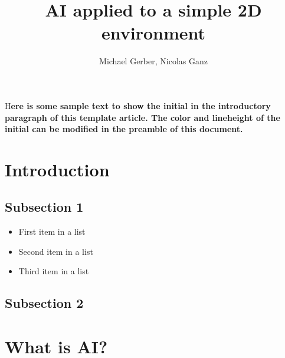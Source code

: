 \documentclass[DIV=calc, paper=a4, fontsize=11pt, twocolumn]{scrartcl}	 %
\title{AI applied to a simple 2D environment} %
\author{Michael Gerber, Nicolas Ganz } %
\date{} %
\newcommand{\initial}[1]{ %
\lettrine[lines=3,lhang=0.3,nindent=0em]{
\color{DarkGoldenrod}
{\textsf{#1}}}{}}
\begin{document}
\maketitle %

\thispagestyle{fancy} %


\initial{H}\textbf{ere is some sample text to show the initial in the introductory paragraph of this template article. The color and lineheight of the initial can be modified in the preamble of this document.}


\section*{Introduction}



\subsection*{Subsection 1}


\begin{itemize}
\item First item in a list 
\item Second item in a list 
\item Third item in a list
\end{itemize}



\subsection*{Subsection 2}



\section*{What is AI?}
\end{document}
